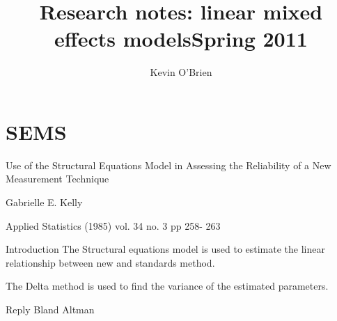 \documentclass[12pt, a4paper]{report}
\title{Research notes: linear mixed effects models}
\author{ } \date{ }
\theoremstyle{plain}
\theoremstyle{definition}
\theoremstyle{remark}
\begin{document}
	\author{Kevin O'Brien}
	\title{Spring 2011}
	
	
	\tableofcontents



%

\chapter{SEMS}

Use of the Structural Equations Model in Assessing the Reliability of a New Measurement Technique

Gabrielle E. Kelly

Applied Statistics (1985) vol. 34 no. 3 pp 258- 263

Introduction
The Structural equations model is used to estimate the linear relationship between new and standards method.

The Delta method is used to find the variance of the estimated parameters.

Reply
Bland Altman 

\end{document}
